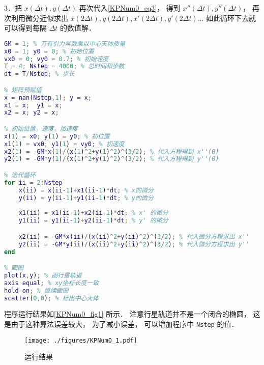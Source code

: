 3．把 $x(\Delta t), y(\Delta t)$ 再次代入\autoref{KPNum0_eq3}， 得到 $x''(\Delta t), y''(\Delta t)$， 再次利用微分近似求出 $x(2\Delta t), y(2\Delta t), x'(2\Delta t), y'(2\Delta t) \dots$ 如此循环下去就可以得到每隔 $\Delta t$ 的数值解．

\begin{lstlisting}[language=matlab, caption=kepler0.m]
% 参数设定
GM = 1; % 万有引力常数乘以中心天体质量
x0 = 1; y0 = 0; % 初始位置
vx0 = 0; vy0 = 0.7; % 初始速度
T = 4; Nstep = 4000; % 总时间和步数
dt = T/Nstep; % 步长

% 矩阵预赋值
x = nan(Nstep,1); y = x;
x1 = x;  y1 = x;
x2 = x; y2 = x;

% 初始位置，速度，加速度
x(1) = x0; y(1) = y0; % 初位置
x1(1) = vx0; y1(1) = vy0; % 初速度
x2(1) = -GM*x(1)/(x(1)^2+y(1)^2)^(3/2); % 代入方程得到 x''(0)
y2(1) = -GM*y(1)/(x(1)^2+y(1)^2)^(3/2); % 代入方程得到 y''(0)

% 迭代循环
for ii = 2:Nstep
    x(ii) = x(ii-1)+x1(ii-1)*dt; % x的微分
    y(ii) = y(ii-1)+y1(ii-1)*dt; % y的微分
    
    x1(ii) = x1(ii-1)+x2(ii-1)*dt; % x' 的微分
    y1(ii) = y1(ii-1)+y2(ii-1)*dt; % y' 的微分

    x2(ii) = -GM*x(ii)/(x(ii)^2+y(ii)^2)^(3/2); % 代入微分方程求出 x''
    y2(ii) = -GM*y(ii)/(x(ii)^2+y(ii)^2)^(3/2); % 代入微分方程求出 y''
end

% 画图
plot(x,y); % 画行星轨道
axis equal; % xy坐标长度一致
hold on; % 继续画图
scatter(0,0); % 标出中心天体
\end{lstlisting}

程序运行结果如\autoref{KPNum0_fig1} 所示． 注意行星轨道并不是一个闭合的椭圆， 这是由于这种算法误差较大， 为了减小误差， 可以增加程序中 \verb|Nstep| 的值．
\begin{figure}[ht]
\centering
\texttt{[image: ./figures/KPNum0\_1.pdf]}
\caption{运行结果} \label{KPNum0_fig1}
\end{figure}
